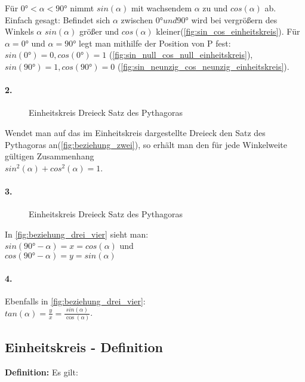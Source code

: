 \documentclass[12pt,a4paper]{article}
\begin{document}
\noindent Für $0° < \alpha < 90°$ nimmt $sin(\alpha)$ mit wachsendem $\alpha$ zu und $cos(\alpha)$ ab. \\
Einfach gesagt: Befindet sich $\alpha$ zwischen $0° und 90°$ wird bei vergrößern des Winkels $\alpha$ $sin(\alpha)$ größer und $cos(\alpha)$ kleiner(\autoref{fig:sin_cos_einheitskreis}).
Für $\alpha = 0°$ und $\alpha = 90°$ legt man mithilfe der Position von P fest: \\
$sin(0°) = 0, cos(0°) = 1$ (\autoref{fig:sin_null_cos_null_einheitskreis}), $sin(90°) = 1, cos(90°) = 0$ (\autoref{fig:sin_neunzig_cos_neunzig_einheitskreis}).

\paragraph{2.} %
\begin{wrapfigure}[4]{r}{0.3\textwidth}
	    \def\svgwidth{130px}
    
    \caption{Einheitskreis Dreieck Satz des Pythagoras}
  	\label{fig:beziehung_zwei}
\end{wrapfigure}
Wendet man auf das im Einheitskreis dargestellte Dreieck den Satz des Pythagoras an(\autoref{fig:beziehung_zwei}), so erhält man den für jede Winkelweite gültigen Zusammenhang \\
$sin^2(\alpha) + cos^2(\alpha) = 1$.
\paragraph{3.}
\begin{wrapfigure}[5]{l}{0.3\textwidth}
	\def\svgwidth{130px}
    
    \caption{Einheitskreis Dreieck Satz des Pythagoras}
  	\label{fig:beziehung_drei_vier}
\end{wrapfigure}
In \autoref{fig:beziehung_drei_vier} sieht man: \\
$sin(90° - \alpha) = x = cos(\alpha)$ und \\
$cos(90° - \alpha) = y = sin(\alpha)$
\paragraph{4.}
Ebenfalls in \autoref{fig:beziehung_drei_vier}:\\
$tan(\alpha) = \frac{y}{x} = \frac{sin(\alpha)}{\cos(\alpha)}$.
\vspace{90px}
\subsection{Einheitskreis - Definition}
\textbf{Definition:} Es gilt:
\end{document}
